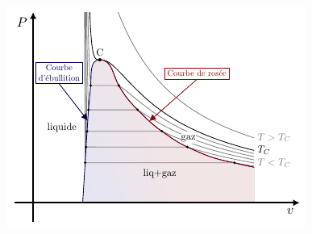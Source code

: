\documentclass[../../main/main.tex]{subfiles}
\begin{document}
\begin{tcb*}
\begin{isd}
\begin{center}
{				\includegraphics[width=\linewidth]{Pv_full}
			}
			\vspace{-15pt}
		\end{center}
	\end{isd}
\end{tcb*}
\end{document}

